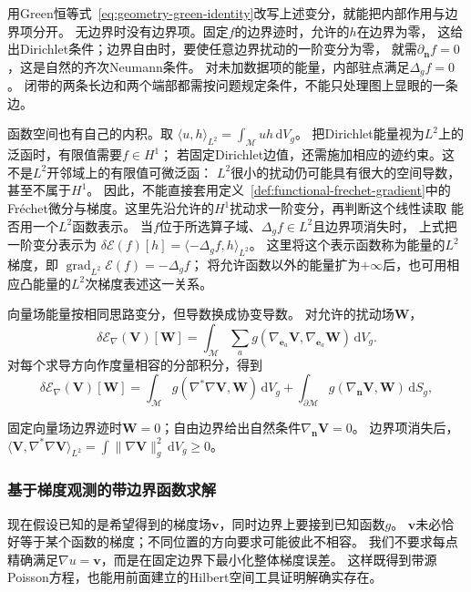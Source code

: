 用Green恒等式~\eqref{eq:geometry-green-identity}改写上述变分，就能把内部作用与边界项分开。
无边界时没有边界项。固定$f$的边界迹时，允许的$h$在边界为零，
这给出Dirichlet条件；边界自由时，要使任意边界扰动的一阶变分为零，
就需$\partial_{\bm n}f=0$，这是自然的齐次Neumann条件。
对未加数据项的能量，内部驻点满足$\Delta_gf=0$。
闭带的两条长边和两个端部都需按问题规定条件，不能只处理图上显眼的一条边。

函数空间也有自己的内积。取
$\langle u,h\rangle_{L^2}=\int_{\mathcal M}uh\,\mathrm dV_g$。
把Dirichlet能量视为$L^2$上的泛函时，有限值需要$f\in H^1$；
若固定Dirichlet边值，还需施加相应的迹约束。这不是$L^2$开邻域上的有限值可微泛函：
$L^2$很小的扰动仍可能具有很大的空间导数，甚至不属于$H^1$。
因此，不能直接套用定义~\ref{def:functional-frechet-gradient}中的
Fréchet微分与梯度。这里先沿允许的$H^1$扰动求一阶变分，再判断这个线性读取
能否用一个$L^2$函数表示。
当$f$位于所选算子域、$\Delta_gf\in L^2$且边界项消失时，
上式把一阶变分表示为
$\delta\mathcal E(f)[h]=\langle-\Delta_gf,h\rangle_{L^2}$。
这里将这个表示函数称为能量的$L^2$梯度，即
$\operatorname{grad}_{L^2}\mathcal E(f)=-\Delta_gf$；
将允许函数以外的能量扩为$+\infty$后，也可用相应凸能量的$L^2$次梯度表述这一关系。


向量场能量按相同思路变分，但导数换成协变导数。
对允许的扰动场$\bm W$，
\[
 \delta\mathcal E_\nabla(\bm V)[\bm W]
 =\int_{\mathcal M}\sum_a
     g(\nabla_{\bm e_a}\bm V,\nabla_{\bm e_a}\bm W)\,\mathrm dV_g.
\]
对每个求导方向作度量相容的分部积分，得到
\begin{equation}
 \delta\mathcal E_\nabla(\bm V)[\bm W]
 =\int_{\mathcal M}g(\nabla^*\nabla\bm V,\bm W)\,\mathrm dV_g
  +\int_{\partial\mathcal M}g(\nabla_{\bm n}\bm V,\bm W)\,\mathrm dS_g,
 \label{eq:geometry-connection-laplacian-variation}
\end{equation}


固定向量场边界迹时$\bm W=0$；自由边界给出自然条件$\nabla_{\bm n}\bm V=0$。
边界项消失后，
$\langle\bm V,\nabla^*\nabla\bm V\rangle_{L^2}
=\int\lVert\nabla\bm V\rVert_g^2\,\mathrm dV_g\geq0$。

\subsubsection{基于梯度观测的带边界函数求解}
\label{sec:functional-guided-poisson-solving}

现在假设已知的是希望得到的梯度场$\bm v$，同时边界上要接到已知函数$g$。
$\bm v$未必恰好等于某个函数的梯度；不同位置的方向要求可能彼此不相容。
我们不要求每点精确满足$\nabla u=\bm v$，而是在固定边界下最小化整体梯度误差。
这样既得到带源Poisson方程，也能用前面建立的Hilbert空间工具证明解确实存在。

